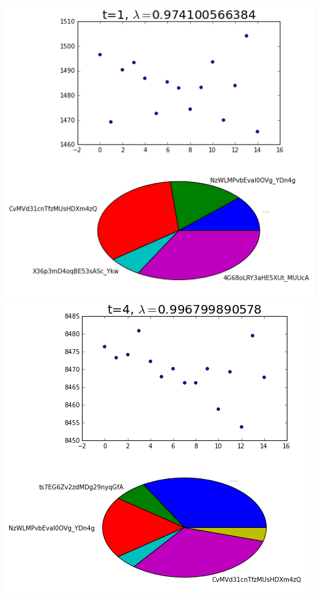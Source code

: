 \documentclass{article}
\begin{document}
		{\centering
		\hspace*{-3.75cm}
		\includegraphics[scale=0.4]{full_1t}
		\hspace*{1cm}
		\includegraphics[scale=0.4]{full_4t}
		\hspace*{-3.75cm}
}
\end{document}
